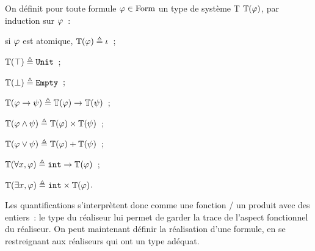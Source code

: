 \begin{definition}
  On définit pour toute formule $\varphi \in \operatorname{Form}$ un type de
  système T $\mathbb{T}(\varphi)$, par induction sur $\varphi$~:
  \begin{itemize}
    \begin{minipage}{0.45\textwidth}
    \item si $\varphi$ est atomique, $\mathbb{T}(\varphi) \triangleq \iota$~;
    \item $\mathbb{T}(\top)\triangleq {\normalfont\texttt{Unit}}$~;
    \item $\mathbb{T}(\bot) \triangleq {\normalfont\texttt{Empty}}$~;
    \item $\mathbb{T}(\varphi\to\psi) \triangleq
      \mathbb{T}(\varphi)\to\mathbb{T}(\psi)$~;
    \end{minipage}
    \begin{minipage}{0.45\textwidth}
    \item $\mathbb{T}(\varphi\land\psi) \triangleq
      \mathbb{T}(\varphi)\times \mathbb{T}(\psi)$~;
    \item $\mathbb{T}(\varphi\lor\psi) \triangleq
      \mathbb{T}(\varphi) + \mathbb{T}(\psi)$~;
    \item $\mathbb{T}(\forall x, \varphi) \triangleq
      {\normalfont\texttt{int}} \to \mathbb{T}(\varphi)$~;
    \item $\mathbb{T}(\exists x, \varphi) \triangleq
      {\normalfont\texttt{int}}\times \mathbb{T}(\varphi)$.
    \end{minipage}
  \end{itemize}
\end{definition}
Les quantifications s'interprètent donc comme une fonction / un produit
avec des entiers~: le type du réaliseur lui permet de garder la trace de
l'aspect fonctionnel du réaliseur. On peut maintenant définir la
réalisation d'une formule, en se restreignant aux réaliseurs qui ont un
type adéquat.

